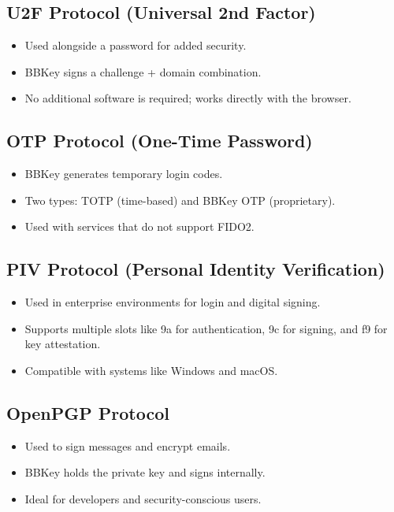 \documentclass[12pt]{article}
\begin{document}
\subsection*{U2F Protocol (Universal 2nd Factor)}
\begin{itemize}
    \item Used alongside a password for added security.
    \item BBKey signs a challenge + domain combination.
    \item No additional software is required; works directly with the browser.
\end{itemize}

\subsection*{OTP Protocol (One-Time Password)}
\begin{itemize}
    \item BBKey generates temporary login codes.
    \item Two types: TOTP (time-based) and BBKey OTP (proprietary).
    \item Used with services that do not support FIDO2.
\end{itemize}

\subsection*{PIV Protocol (Personal Identity Verification)}
\begin{itemize}
    \item Used in enterprise environments for login and digital signing.
    \item Supports multiple slots like 9a for authentication, 9c for signing, and f9 for key attestation.
    \item Compatible with systems like Windows and macOS.
\end{itemize}

\subsection*{OpenPGP Protocol}
\begin{itemize}
    \item Used to sign messages and encrypt emails.
    \item BBKey holds the private key and signs internally.
    \item Ideal for developers and security-conscious users.
\end{itemize}
\end{document}
